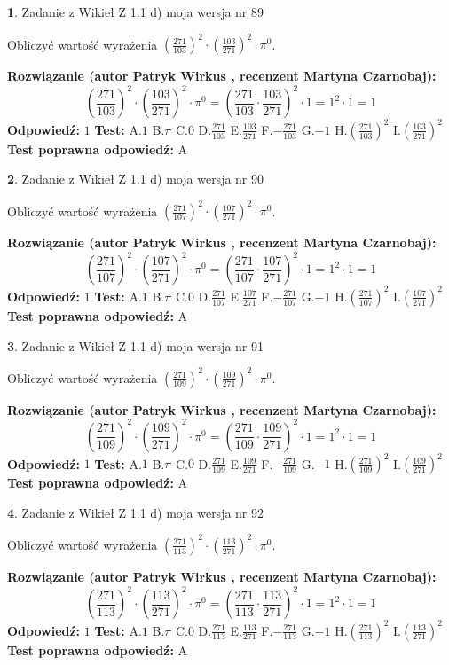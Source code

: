\documentclass[12pt, a4paper]{article}
\theoremstyle{definition} %
\newtheorem{zad}{}
\newcommand{\zadStart}[1]{\begin{zad}#1\newline}
\newcommand{\zadStop}{\end{zad}}
\newcommand{\rozwStart}[2]{\noindent \textbf{Rozwiązanie (autor #1 , recenzent #2): }\newline}
\newcommand{\rozwStop}{\newline}
\newcommand{\odpStart}{\noindent \textbf{Odpowiedź:}\newline}
\newcommand{\odpStop}{\newline}
\newcommand{\testStart}{\noindent \textbf{Test:}\newline}
\newcommand{\testStop}{\newline}
\newcommand{\kluczStart}{\noindent \textbf{Test poprawna odpowiedź:}\newline}
\newcommand{\kluczStop}{\newline}
\begin{document}
\zadStart{Zadanie z Wikieł Z 1.1 d) moja wersja nr 89}

Obliczyć wartość wyrażenia $(\frac{271}{103})^{2} \cdot (\frac{103}{271})^{2} \cdot \pi^{0}$.
\zadStop
\rozwStart{Patryk Wirkus}{Martyna Czarnobaj}
$$(\frac{271}{103})^{2} \cdot (\frac{103}{271})^{2} \cdot \pi^{0} = (\frac{271}{103} \cdot \frac{103}{271})^{2} \cdot 1 = 1^{2} \cdot 1 = 1$$
\rozwStop
\odpStart
$1$
\odpStop
\testStart
A.$1$ B.$\pi$ C.$0$ D.$\frac{271}{103}$ E.$\frac{103}{271}$
F.$-\frac{271}{103}$ G.$-1$
H.$(\frac{271}{103})^{2}$
I.$(\frac{103}{271})^{2}$
\testStop
\kluczStart
A
\kluczStop



\zadStart{Zadanie z Wikieł Z 1.1 d) moja wersja nr 90}

Obliczyć wartość wyrażenia $(\frac{271}{107})^{2} \cdot (\frac{107}{271})^{2} \cdot \pi^{0}$.
\zadStop
\rozwStart{Patryk Wirkus}{Martyna Czarnobaj}
$$(\frac{271}{107})^{2} \cdot (\frac{107}{271})^{2} \cdot \pi^{0} = (\frac{271}{107} \cdot \frac{107}{271})^{2} \cdot 1 = 1^{2} \cdot 1 = 1$$
\rozwStop
\odpStart
$1$
\odpStop
\testStart
A.$1$ B.$\pi$ C.$0$ D.$\frac{271}{107}$ E.$\frac{107}{271}$
F.$-\frac{271}{107}$ G.$-1$
H.$(\frac{271}{107})^{2}$
I.$(\frac{107}{271})^{2}$
\testStop
\kluczStart
A
\kluczStop



\zadStart{Zadanie z Wikieł Z 1.1 d) moja wersja nr 91}

Obliczyć wartość wyrażenia $(\frac{271}{109})^{2} \cdot (\frac{109}{271})^{2} \cdot \pi^{0}$.
\zadStop
\rozwStart{Patryk Wirkus}{Martyna Czarnobaj}
$$(\frac{271}{109})^{2} \cdot (\frac{109}{271})^{2} \cdot \pi^{0} = (\frac{271}{109} \cdot \frac{109}{271})^{2} \cdot 1 = 1^{2} \cdot 1 = 1$$
\rozwStop
\odpStart
$1$
\odpStop
\testStart
A.$1$ B.$\pi$ C.$0$ D.$\frac{271}{109}$ E.$\frac{109}{271}$
F.$-\frac{271}{109}$ G.$-1$
H.$(\frac{271}{109})^{2}$
I.$(\frac{109}{271})^{2}$
\testStop
\kluczStart
A
\kluczStop



\zadStart{Zadanie z Wikieł Z 1.1 d) moja wersja nr 92}

Obliczyć wartość wyrażenia $(\frac{271}{113})^{2} \cdot (\frac{113}{271})^{2} \cdot \pi^{0}$.
\zadStop
\rozwStart{Patryk Wirkus}{Martyna Czarnobaj}
$$(\frac{271}{113})^{2} \cdot (\frac{113}{271})^{2} \cdot \pi^{0} = (\frac{271}{113} \cdot \frac{113}{271})^{2} \cdot 1 = 1^{2} \cdot 1 = 1$$
\rozwStop
\odpStart
$1$
\odpStop
\testStart
A.$1$ B.$\pi$ C.$0$ D.$\frac{271}{113}$ E.$\frac{113}{271}$
F.$-\frac{271}{113}$ G.$-1$
H.$(\frac{271}{113})^{2}$
I.$(\frac{113}{271})^{2}$
\testStop
\kluczStart
A
\kluczStop
\end{document}
